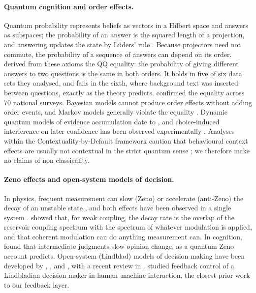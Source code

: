 \documentclass[11pt]{article}
\theoremstyle{definition}
\theoremstyle{remark}
\begin{document}
\paragraph{Quantum cognition and order effects.} Quantum probability represents beliefs as vectors in a Hilbert space and answers as subspaces; the probability of an answer is the squared length of a projection, and answering updates the state by L\"uders' rule \citep{luders1951,busemeyer2012book,pothos2013}. Because projectors need not commute, the probability of a sequence of answers can depend on its order. \citet{wang2013} derived from these axioms the QQ equality: the probability of giving different answers to two questions is the same in both orders. It holds in five of six data sets they analysed, and fails in the sixth, where background text was inserted between questions, exactly as the theory predicts. \citet{wang2014} confirmed the equality across 70 national surveys. Bayesian models cannot produce order effects without adding order events, and Markov models generally violate the equality \citep{wang2013}. Dynamic quantum models of evidence accumulation date to \citet{busemeyer2006}, and choice-induced interference on later confidence has been observed experimentally \citep{kvam2015,busemeyer2019}. Analyses within the Contextuality-by-Default framework caution that behavioural context effects are usually not contextual in the strict quantum sense \citep{dzhafarov2016}; we therefore make no claims of non-classicality.

\paragraph{Zeno effects and open-system models of decision.} In physics, frequent measurement can slow (Zeno) or accelerate (anti-Zeno) the decay of an unstable state \citep{misra1977,kofman2000}, and both effects have been observed in a single system \citep{fischer2001}. \citet{kofman2001,kofman2005} showed that, for weak coupling, the decay rate is the overlap of the reservoir coupling spectrum with the spectrum of whatever modulation is applied, and that coherent modulation can do anything measurement can. In cognition, \citet{yearsley2016} found that intermediate judgments slow opinion change, as a quantum Zeno account predicts. Open-system (Lindblad) models of decision making have been developed by \citet{asano2011}, \citet{martinez2016}, and \citet{busemeyer2020entropy}, with a recent review in \citet{asano2026review}. \citet{snow2024} studied feedback control of a Lindbladian decision maker in human--machine interaction, the closest prior work to our feedback layer.
\end{document}
